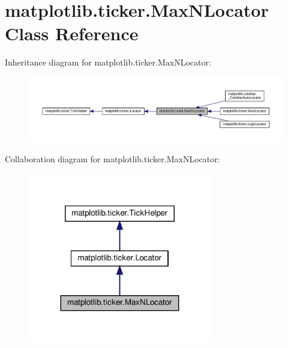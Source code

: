 \hypertarget{classmatplotlib_1_1ticker_1_1MaxNLocator}{}\section{matplotlib.\+ticker.\+Max\+N\+Locator Class Reference}
\label{classmatplotlib_1_1ticker_1_1MaxNLocator}


Inheritance diagram for matplotlib.\+ticker.\+Max\+N\+Locator\+:
\nopagebreak
\begin{figure}[H]
\begin{center}
\leavevmode
\includegraphics[width=350pt]{classmatplotlib_1_1ticker_1_1MaxNLocator__inherit__graph}
\end{center}
\end{figure}


Collaboration diagram for matplotlib.\+ticker.\+Max\+N\+Locator\+:
\nopagebreak
\begin{figure}[H]
\begin{center}
\leavevmode
\includegraphics[width=227pt]{classmatplotlib_1_1ticker_1_1MaxNLocator__coll__graph}
\end{center}
\end{figure}
